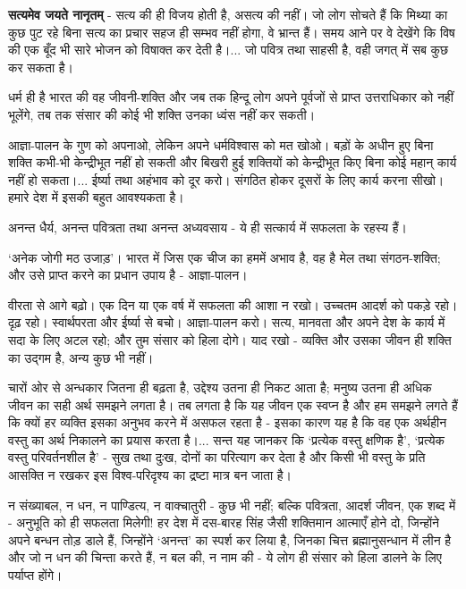 \textbf{सत्यमेव जयते नानृतम् } - सत्य की ही विजय होती है, असत्य की नहीं। जो लोग सोचते हैं कि मिथ्या का कुछ पुट रहे बिना सत्य का प्रचार सहज ही सम्भव नहीं होगा, वे भ्रान्त हैं। समय आने पर वे देखेंगे कि विष की एक बूँद भी सारे भोजन को विषाक्त कर देती है।... जो पवित्र तथा साहसी है, वही जगत् में सब कुछ कर सकता है। 

धर्म ही है भारत की वह जीवनी-शक्ति और जब तक हिन्दू लोग अपने पूर्वजों से प्राप्त उत्तराधिकार को नहीं भूलेंगे, तब तक संसार की कोई भी शक्ति उनका ध्वंस नहीं कर सकती। 

आज्ञा-पालन के गुण को अपनाओ, लेकिन अपने धर्मविश्वास को मत खोओ। बड़ों के अधीन हुए बिना शक्ति कभी-भी केन्द्रीभूत नहीं हो सकती और बिखरी हुई शक्तियों को केन्द्रीभूत किए बिना कोई महान् कार्य नहीं हो सकता।... ईर्ष्या तथा अहंभाव को दूर करो। संगठित होकर दूसरों के लिए कार्य करना सीखो। हमारे देश में इसकी बहुत आवश्यकता है। 

अनन्त धैर्य, अनन्त पवित्रता तथा अनन्त अध्यवसाय - ये ही सत्कार्य में सफलता के रहस्य हैं। 

‘अनेक जोगी मठ उजाड़’। भारत में जिस एक चीज का हममें अभाव है, वह है मेल तथा संगठन-शक्ति; और उसे प्राप्त करने का प्रधान उपाय है - आज्ञा-पालन। 

वीरता से आगे बढ़ो। एक दिन या एक वर्ष में सफलता की आशा न रखो। उच्चतम आदर्श को पकड़े रहो। दृढ़ रहो। स्वार्थपरता और ईर्ष्या से बचो। आज्ञा-पालन करो। सत्य, मानवता और अपने देश के कार्य में सदा के लिए अटल रहो; और तुम संसार को हिला दोगे। याद रखो - व्यक्ति और उसका जीवन ही शक्ति का उद्गम है, अन्य कुछ भी नहीं। 

चारों ओर से अन्धकार जितना ही बढ़ता है, उद्देश्य उतना ही निकट आता है; मनुष्य उतना ही अधिक जीवन का सही अर्थ समझने लगता है। तब लगता है कि यह जीवन एक स्वप्न है और हम समझने लगते हैं कि क्यों हर व्यक्ति इसका अनुभव करने में असफल रहता है - इसका कारण यह है कि वह एक अर्थहीन वस्तु का अर्थ निकालने का प्रयास करता है।... सन्त यह जानकर कि ‘प्रत्येक वस्तु क्षणिक है’, ‘प्रत्येक वस्तु परिवर्तनशील है’ - सुख तथा दुःख, दोनों का परित्याग कर देता है और किसी भी वस्तु के प्रति आसक्ति न रखकर इस विश्व-परिदृश्य का द्रष्टा मात्र बन जाता है। 

न संख्याबल, न धन, न पाण्डित्य, न वाक्चातुरी - कुछ भी नहीं; बल्कि पवित्रता, आदर्श जीवन, एक शब्द में - अनुभूति को ही सफलता मिलेगी! हर देश में दस-बारह सिंह जैसी शक्तिमान आत्माएँ होने दो, जिन्होंने अपने बन्धन तोड़ डाले हैं, जिन्होंने ‘अनन्त’ का स्पर्श कर लिया है, जिनका चित्त ब्रह्मानुसन्धान में लीन है और जो न धन की चिन्ता करते हैं, न बल की, न नाम की - ये लोग ही संसार को हिला डालने के लिए पर्याप्त होंगे। 

